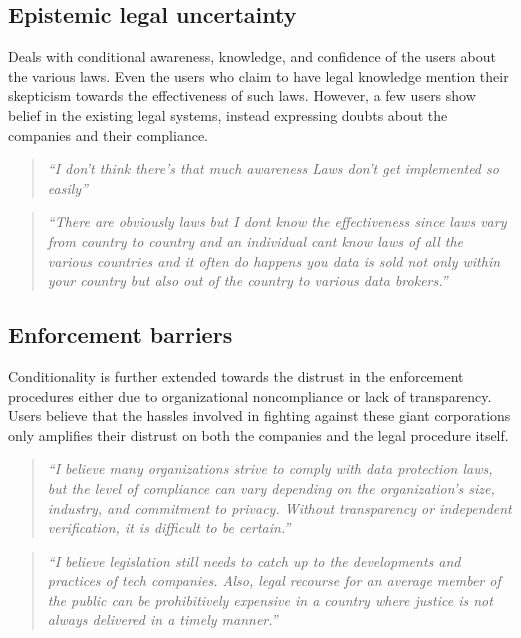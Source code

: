 \subsection{Epistemic legal uncertainty} \label{T4.1: mixed legal awareness}
Deals with conditional awareness, knowledge, and confidence of the users about the various laws. Even the users who claim to have legal knowledge mention their skepticism towards the effectiveness of such laws. However, a few users show belief in the existing legal systems, instead expressing doubts about the companies and their compliance.
        \begin{quote}
            \textit{``I don't think there's that much awareness Laws don't get implemented so easily''}
        \end{quote}
        \begin{quote}
            \textit{``There are obviously laws but I dont know the effectiveness since laws vary from country to country and an individual cant know laws of all the various countries and it often do happens you data is sold not only within your country but also out of the country to various data brokers.''}
        \end{quote}
        
\subsection{Enforcement barriers} \label{T4.2:enforcement gaps}
Conditionality is further extended towards the distrust in the enforcement procedures either due to organizational noncompliance or lack of transparency. Users believe that the hassles involved in fighting against these giant corporations only amplifies their distrust on both the companies and the legal procedure itself.
        \begin{quote}
            \textit{``I believe many organizations strive to comply with data protection laws, but the level of compliance can vary depending on the organization's size, industry, and commitment to privacy. Without transparency or independent verification, it is difficult to be certain.''}
        \end{quote}
        \begin{quote}
            \textit{``I believe legislation still needs to catch up to the developments and practices of tech companies. Also, legal recourse for an average member of the public can be prohibitively expensive in a country where justice is not always delivered in a timely manner.''}
        \end{quote}

